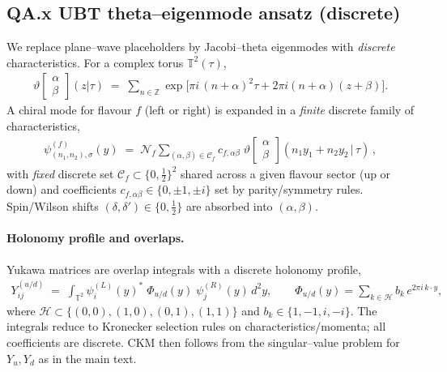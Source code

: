 \subsection*{QA.x UBT theta–eigenmode ansatz (discrete)}

We replace plane–wave placeholders by Jacobi–theta eigenmodes with \emph{discrete} characteristics. For a complex torus $\mathbb{T}^2(\tau)$,
\begin{align}
  \vartheta\!\left[\!\begin{array}{c}\alpha\\[-2pt]\beta\end{array}\!\right](z|\tau)
  \;=\;\sum_{n\in\mathbb{Z}}\exp\!\big[\pi i\, (n+\alpha)^2 \tau + 2\pi i (n+\alpha)(z+\beta)\big].
\end{align}
A chiral mode for flavour $f$ (left or right) is expanded in a \emph{finite} discrete family of characteristics,
\begin{align}
  \psi^{(f)}_{(n_1,n_2),\sigma}(y)
  \;=\;
  \mathcal{N}_f\sum_{(\alpha,\beta)\in \mathcal{C}_f}
  c_{f,\alpha\beta}\;
  \vartheta\!\left[\!\begin{array}{c}\alpha\\[-2pt]\beta\end{array}\!\right](n_1 y_1 + n_2 y_2 \,|\, \tau)\,,
\end{align}
with \emph{fixed} discrete set $\mathcal{C}_f\subset\{0,\tfrac12\}^2$ shared across a given flavour sector (up or down) and coefficients $c_{f,\alpha\beta}\in\{0,\pm1,\pm i\}$ set by parity/symmetry rules. Spin/Wilson shifts $(\delta,\delta')\in\{0,\tfrac12\}$ are absorbed into $(\alpha,\beta)$.

\paragraph{Holonomy profile and overlaps.}
Yukawa matrices are overlap integrals with a discrete holonomy profile,
\begin{align}
  Y^{(u/d)}_{ij}
  \;=\;\int_{\mathbb{T}^2} \psi^{(L)}_i(y)^\ast\;
  \Phi_{u/d}(y)\;\psi^{(R)}_j(y)\,d^2y,\qquad
  \Phi_{u/d}(y)=\!\!\sum_{k\in \mathcal{H}}\! b_k\,e^{2\pi i\,k\cdot y},
\end{align}
where $\mathcal{H}\subset\{(0,0),(1,0),(0,1),(1,1)\}$ and $b_k\in\{1,-1,i,-i\}$. The integrals reduce to Kronecker selection rules on characteristics/momenta; all coefficients are discrete. CKM then follows from the singular–value problem for $Y_u,Y_d$ as in the main text.

